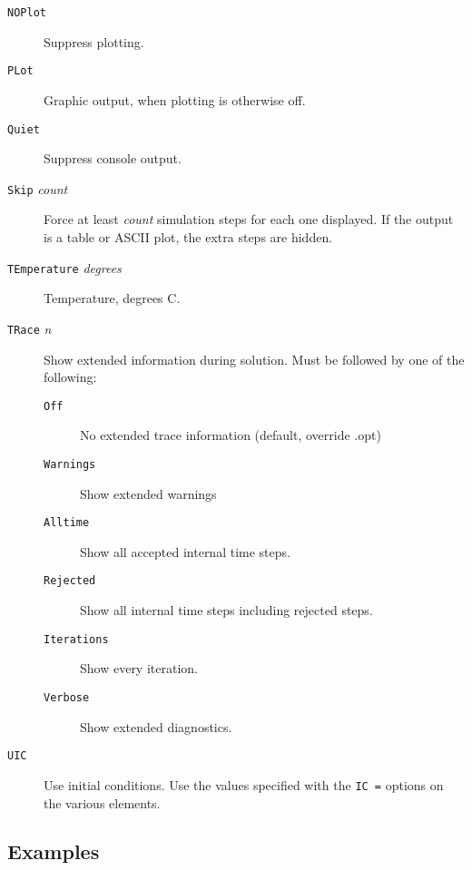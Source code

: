 \begin{description}


\item[{\tt NOPlot}] Suppress plotting.

\item[{\tt PLot}] Graphic output, when plotting is otherwise
off.

\item[{\tt Quiet}] Suppress console output.

\item[{\tt Skip} {\it count}] Force at least {\it count} simulation
steps for each one displayed.  If the output is a table or ASCII plot, the
extra steps are hidden.


\item[{\tt TEmperature} {\it degrees}] Temperature, degrees C.

\item[{\tt TRace} {\it n}] Show extended information during solution.
Must be followed by one of the following:
\begin{description}
\item[{\tt Off}] No extended trace information (default, override .opt)
\item[{\tt Warnings}] Show extended warnings
\item[{\tt Alltime}] Show all accepted internal time steps.
\item[{\tt Rejected}] Show all internal time steps including rejected steps.
\item[{\tt Iterations}] Show every iteration.
\item[{\tt Verbose}] Show extended diagnostics.
\end{description}

\item[{\tt UIC}] Use initial conditions.  Use the values
specified with the {\tt IC =} options on the various elements.

\end{description}
\subsection{Examples}

